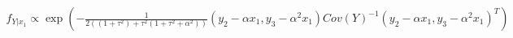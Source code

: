 \documentclass[12pt,a4paper]{article}
\begin{document}
\begin{itemize}
	\begin{align*}
	f_{Y|x_{1}}\propto\exp\left(-\frac{1}{2((1+\tau^{2} )+\tau^{2}(1+\tau^{2}+\alpha^{2}))}(y_{2}-\alpha x_{1}, y_{3}-\alpha^{2}x_{1})	Cov(Y)^{-1}(y_{2}-\alpha x_{1}, y_{3}-\alpha^{2}x_{1})^{T}\right)
	\end{align*}
	

\end{itemize}
\end{document}
